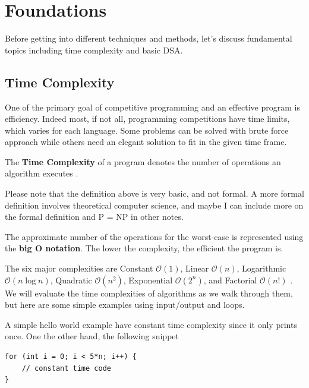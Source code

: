\documentclass[../../../main.tex]{subfiles}
\begin{document}
\chapter{Foundations}

Before getting into different techniques and methods, let's discuss
fundamental topics including time complexity and basic DSA.

\section{Time Complexity}

One of the primary goal of competitive programming and an effective
program is efficiency. Indeed most, if not all, programming
competitions have time limits, which varies for each language.
Some problems can be solved with brute force approach while others
need an elegant solution to fit in the given time frame.

\begin{definition}{}{}
The \textbf{Time Complexity} of a program denotes the number of
operations an algorithm executes \cite{CS02-5}.
\end{definition}

Please note that the definition above is very basic, and not formal.
A more formal definition involves theoretical computer science, and
maybe I can include more on the formal definition and P = NP in
other notes.

The approximate number of the operations for the worst-case is
represented using the \textbf{big O notation}. The lower the
complexity, the efficient the program is.

The six major complexities are Constant $\mathcal{O}(1)$, Linear
$\mathcal{O}(n)$, Logarithmic $\mathcal{O}(n \log n)$, Quadratic
$\mathcal{O}(n^2)$, Exponential $\mathcal{O}(2^n)$, and Factorial
$\mathcal{O}(n!)$ \cite{CS02-8}. We will evaluate the time
complexities of algorithms as we walk through them, but here are
some simple examples using input/output and loops.

A simple hello world example have constant time complexity since it
only prints once. One the other hand, the following snippet

\begin{basicbox}
\begin{lstlisting}[style=cppstyle]
for (int i = 0; i < 5*n; i++) {
    // constant time code
}
\end{lstlisting}
\end{basicbox}
\end{document}
